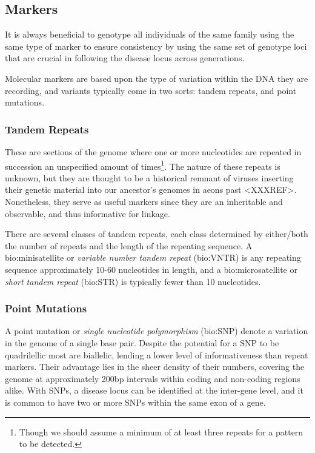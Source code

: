\subsection{Markers}
It is always beneficial to genotype all individuals of the same family using the same type of marker to ensure consistency by using the same set of genotype loci that are crucial in following the disease locus across generations.

Molecular markers are based upon the type of variation within the DNA they are recording, and variants typically come in two sorts: tandem repeats, and point mutations.

\subsubsection{Tandem Repeats}

These are sections of the genome where one or more nucleotides are repeated in succession an unspecified amount of times\footnote{Though we should assume a minimum of at least three repeats for a pattern to be detected.}. The nature of these repeats is unknown, but they are thought to be a historical remnant of viruses inserting their genetic material into our ancestor's genomes in aeons past <XXXREF>.   Nonetheless, they serve as useful markers since they are an inheritable and observable, and thus informative for linkage.

There are several classes of tandem repeats, each class determined by either/both the number of repeats and the length of the repeating sequence. A \gls{bio:minisatellite} or \textit{variable number tandem repeat} (\gls{bio:VNTR}) is any repeating sequence approximately 10-60 nucleotides in length, and a \gls{bio:microsatellite} or \textit{short tandem repeat} (\gls{bio:STR}) is typically fewer than 10 nucleotides.

\subsubsection{Point Mutations}

A point mutation or \textit{single nucleotide polymorphism} (\gls{bio:SNP}) denote a variation in the genome of a single base pair. Despite the potential for a SNP to be quadrilellic most are biallelic, lending a lower  level of informativeness than repeat markers. Their advantage lies in the sheer density of their numbers, covering the genome at approximately 200bp intervals within coding and non-coding regions alike. With SNPs, a disease locus can be identified at the inter-gene level, and it is common to have two or more SNPs within the same exon of a gene. 

